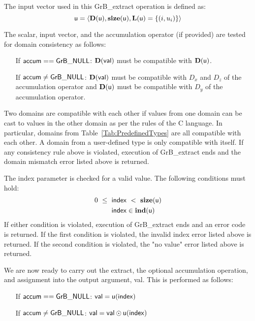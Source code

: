 The input vector used in this {\sf GrB\_extract} operation is defined as:
\[
	{\sf u} = \langle \bold{D}({\sf u}),\bold{size}({\sf u}),
    \bold{L}({\sf u}) = \{(i,u_i) \} \rangle
\]

The scalar, input vector, and the accumulation 
operator (if provided) are tested for domain consistency as follows:
\begin{itemize}[leftmargin=2.2in]
	\item[If ${\sf accum} == {\sf GrB\_NULL}$:]  $\bold{D}({\sf val})$ must be 
    compatible with $\bold{D}({\sf u})$.

	\item[If ${\sf accum} \neq {\sf GrB\_NULL}$:]  $\bold{D}({\sf val})$ must
    be compatible with $D_x$ and $D_z$ of the accumulation operator and 
    $\bold{D}({\sf u})$ must be compatible with $D_y$ of the accumulation operator.
\end{itemize}
Two domains are compatible with each other if values from one domain can be cast 
to values in the other domain as per the rules of the C language.
In particular, domains from Table~\ref{Tab:PredefinedTypes} are all compatible 
with each other. A domain from a user-defined type is only compatible with itself.
If any consistency rule above is violated, execution of {\sf GrB\_extract} ends
and the domain mismatch error listed above is returned.

The {\sf index} parameter is checked for a valid value.  The following
conditions must hold:
\[
\begin{aligned}
	0\ \leq\ {\sf index} & \ <\ \bold{size}({\sf u}) \\
    {\sf index} & \in \bold{ind}({\sf u})
\end{aligned}
\]
If either condition is violated, execution of {\sf GrB\_extract} ends and
an error code is returned. If the first condition is violated, the invalid 
index error listed above is returned.  If the second condition is violated,
the "no value" error listed above is returned.

We are now ready to carry out the extract, the optional accumulation
operation, and assignment into the output argument, {\sf val}.  This is performed
as follows:
\begin{itemize}[leftmargin=2.2in]
	\item[If ${\sf accum} == {\sf GrB\_NULL}$:] ${\sf val} = {\sf u}({\sf index})$
    \item[If ${\sf accum} \neq {\sf GrB\_NULL}$:] ${\sf val} = {\sf val} \odot 
    {\sf u}({\sf index})$
\end{itemize}

